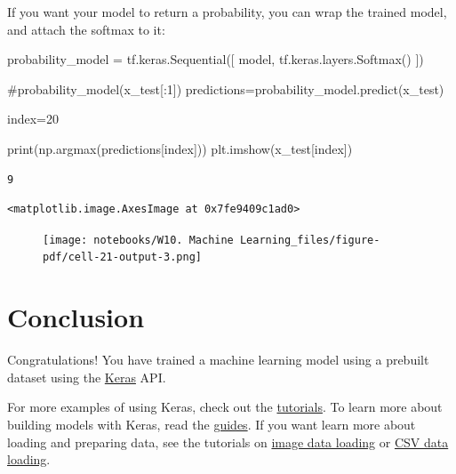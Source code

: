 \documentclass[
  letterpaper,
  DIV=11,
  numbers=noendperiod]{scrreprt}
\newenvironment{Shaded}{\begin{snugshade}}{\end{snugshade}}
\newcommand{\BuiltInTok}[1]{\textcolor[rgb]{0.00,0.23,0.31}{#1}}
\newcommand{\CommentTok}[1]{\textcolor[rgb]{0.37,0.37,0.37}{#1}}
\newcommand{\DecValTok}[1]{\textcolor[rgb]{0.68,0.00,0.00}{#1}}
\newcommand{\NormalTok}[1]{\textcolor[rgb]{0.00,0.23,0.31}{#1}}
\newcommand{\OperatorTok}[1]{\textcolor[rgb]{0.37,0.37,0.37}{#1}}
\begin{document}
If you want your model to return a probability, you can wrap the trained
model, and attach the softmax to it:

\begin{Shaded}
\begin{Highlighting}[]
\NormalTok{probability\_model }\OperatorTok{=}\NormalTok{ tf.keras.Sequential([}
\NormalTok{  model,}
\NormalTok{  tf.keras.layers.Softmax()}
\NormalTok{])}
\end{Highlighting}
\end{Shaded}

\begin{Shaded}
\begin{Highlighting}[]
\CommentTok{\#probability\_model(x\_test[:1])}
\NormalTok{predictions}\OperatorTok{=}\NormalTok{probability\_model.predict(x\_test)}

\NormalTok{index}\OperatorTok{=}\DecValTok{20}

\BuiltInTok{print}\NormalTok{(np.argmax(predictions[index]))}
\NormalTok{plt.imshow(x\_test[index])}
\end{Highlighting}
\end{Shaded}

\begin{verbatim}
9
\end{verbatim}

\begin{verbatim}
<matplotlib.image.AxesImage at 0x7fe9409c1ad0>
\end{verbatim}

\begin{figure}[H]

{\centering \texttt{[image: notebooks/W10. Machine Learning\_files/figure-pdf/cell-21-output-3.png]}

}

\end{figure}

\hypertarget{conclusion}{%
\section{Conclusion}\label{conclusion}}

Congratulations! You have trained a machine learning model using a
prebuilt dataset using the
\href{https://www.tensorflow.org/guide/keras/overview}{Keras} API.

For more examples of using Keras, check out the
\href{https://www.tensorflow.org/tutorials/keras/}{tutorials}. To learn
more about building models with Keras, read the
\href{https://www.tensorflow.org/guide/keras}{guides}. If you want learn
more about loading and preparing data, see the tutorials on
\href{https://www.tensorflow.org/tutorials/load_data/images}{image data
loading} or
\href{https://www.tensorflow.org/tutorials/load_data/csv}{CSV data
loading}.
\end{document}
